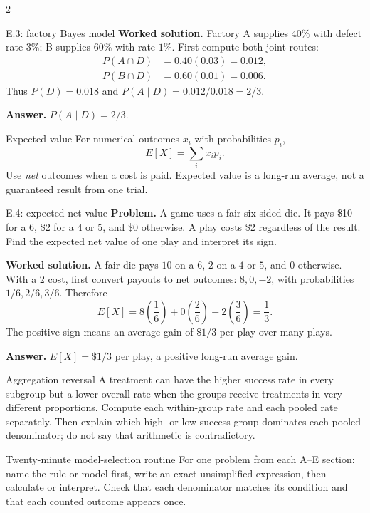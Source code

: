 \documentclass[10pt]{article}
\begin{document}
\begin{multicols}{2}
\begin{workedbox}{E.3: factory Bayes model}
\textbf{Worked solution.} Factory A supplies $40\%$ with defect rate $3\%$; B supplies $60\%$ with rate
$1\%$. First compute both joint routes:
\[
\begin{aligned}
P(A\cap D)&=0.40(0.03)=0.012,\\
P(B\cap D)&=0.60(0.01)=0.006.
\end{aligned}
\]
Thus $P(D)=0.018$ and $P(A\mid D)=0.012/0.018=2/3$.

\textbf{Answer.} $P(A\mid D)=2/3$.
\end{workedbox}


\begin{definitionbox}{Expected value}
For numerical outcomes $x_i$ with probabilities $p_i$,
\[
E[X]=\sum_i x_i p_i.
\]
Use \emph{net} outcomes when a cost is paid. Expected value is a long-run
average, not a guaranteed result from one trial.
\end{definitionbox}

\begin{workedbox}{E.4: expected net value}
\textbf{Problem.} A game uses a fair six-sided die. It pays \$10 for a $6$, \$2 for a $4$ or $5$, and \$0 otherwise. A play costs \$2 regardless of the result. Find the expected net value of one play and interpret its sign.

\textbf{Worked solution.} A fair die pays $10$ on a $6$, $2$ on a $4$ or $5$, and $0$ otherwise. With a
$2$ cost, first convert payouts to net outcomes: $8,0,-2$, with probabilities
$1/6,2/6,3/6$. Therefore
\[
E[X]=8\left(\frac16\right)+0\left(\frac26\right)
-2\left(\frac36\right)=\frac13.
\]
The positive sign means an average gain of $\$1/3$ per play over many plays.

\textbf{Answer.} $E[X]=\$1/3$ per play, a positive long-run average gain.
\end{workedbox}

\begin{definitionbox}{Aggregation reversal}
A treatment can have the higher success rate in every subgroup but a lower
overall rate when the groups receive treatments in very different proportions.
Compute each within-group rate and each pooled rate separately. Then explain
which high- or low-success group dominates each pooled denominator; do not say
that arithmetic is contradictory.
\end{definitionbox}

\begin{methodbox}{Twenty-minute model-selection routine}
For one problem from each A--E section: name the rule or model first, write an
exact unsimplified expression, then calculate or interpret. Check that each
denominator matches its condition and that each counted outcome appears once.
\end{methodbox}


\end{multicols}
\end{document}
